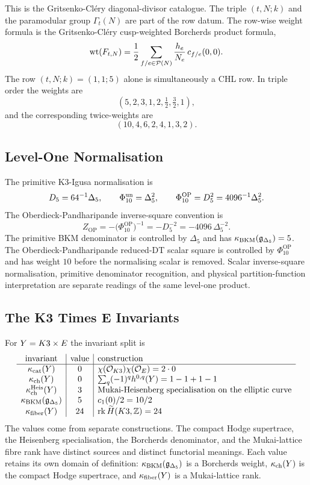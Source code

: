 This is the Gritsenko-Cl\'ery diagonal-divisor catalogue.  The triple
$(t,N;k)$ and the paramodular group $\Gamma_t(N)$ are part of the row
datum.  The row-wise weight formula is the Gritsenko-Cl\'ery
cusp-weighted Borcherds product formula,
\[
 \mathrm{wt}(F_{t,N})=
 \frac12\sum_{f/e\in\mathcal P(N)}
 \frac{h_e}{N_e}\,c_{f/e}(0,0).
\]
The row $(t,N;k)=(1,1;5)$ alone is simultaneously a CHL row.  In triple
order the weights are
\[
 (5,2,3,1,2,\tfrac12,\tfrac32,1),
\]
and the corresponding twice-weights are
\[
 (10,4,6,2,4,1,3,2).
\]

\subsection*{Level-One Normalisation}

The primitive K3-Igusa normalisation is
\[
 D_5 = 64^{-1}\Delta_5,\qquad
 \Phi_{10}^{\mathrm{un}}=\Delta_5^2,\qquad
 \Phi_{10}^{\mathrm{OP}}=D_5^2=4096^{-1}\Delta_5^2 .
\]
The Oberdieck-Pandharipande inverse-square convention is
\[
 Z_{\mathrm{OP}}
 =-\bigl(\Phi_{10}^{\mathrm{OP}}\bigr)^{-1}
 =-D_5^{-2}
 =-4096\,\Delta_5^{-2}.
\]
The primitive BKM denominator is controlled by $\Delta_5$ and has
$\kappa_{\mathrm{BKM}}(\mathfrak{g}_{\Delta_5})=5$.  The Oberdieck-Pandharipande reduced-DT scalar
square is controlled by $\Phi_{10}^{\mathrm{OP}}$ and has weight $10$
before the normalising scalar is removed.  Scalar inverse-square
normalisation, primitive denominator recognition, and physical
partition-function interpretation are separate readings of the same
level-one product.

\subsection*{The K3 Times E Invariants}

For $Y=K3\times E$ the invariant split is
\[
\begin{array}{c|c|l}
\text{invariant} & \text{value} & \text{construction}\\\hline
\kappa_{\mathrm{cat}}(Y) & 0 &
  \chi(\mathcal{O}_{K3})\chi(\mathcal{O}_E)=2\cdot 0\\
\kappa_{\mathrm{ch}}(Y) & 0 &
  \sum_q(-1)^q h^{0,q}(Y)=1-1+1-1\\
\kappa_{\mathrm{ch}}^{\mathrm{Heis}}(Y) & 3 &
  \text{Mukai-Heisenberg specialisation on the elliptic curve}\\
\kappa_{\mathrm{BKM}}(\mathfrak{g}_{\Delta_5}) & 5 &
  c_1(0)/2=10/2\\
\kappa_{\mathrm{fiber}}(Y) & 24 &
  \operatorname{rk}\widetilde H(K3,\mathbb{Z})=24
\end{array}
\]
The values come from separate constructions.  The compact Hodge
supertrace, the Heisenberg specialisation, the Borcherds denominator,
and the Mukai-lattice fibre rank have distinct sources and distinct
functorial meanings.  Each value retains its own domain of definition:
$\kappa_{\mathrm{BKM}}(\mathfrak{g}_{\Delta_5})$ is a Borcherds weight, $\kappa_{\mathrm{ch}}(Y)$ is the compact Hodge
supertrace, and $\kappa_{\mathrm{fiber}}(Y)$ is a Mukai-lattice rank.

